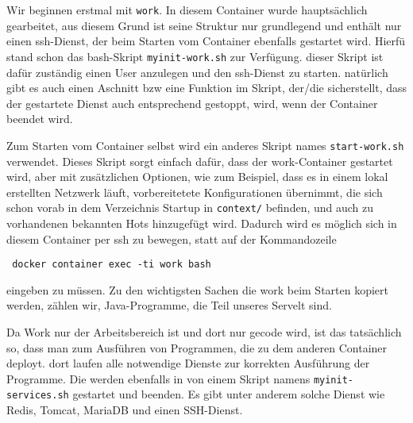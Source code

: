 Wir beginnen erstmal mit \texttt{work}. In diesem Container wurde hauptsächlich gearbeitet, aus diesem Grund ist seine Struktur nur grundlegend und enthält nur einen ssh-Dienst, der beim Starten vom Container ebenfalls gestartet wird. Hierfü stand schon das bash-Skript \texttt{myinit-work.sh} zur Verfügung. dieser Skript ist dafür zuständig einen User anzulegen und den ssh-Dienst zu starten. natürlich gibt es auch einen Aschnitt bzw eine Funktion im Skript, der/die sicherstellt, dass der gestartete Dienst auch entsprechend gestoppt, wird, wenn der Container beendet wird.



Zum Starten vom Container selbst wird ein anderes Skript names \texttt{start-work.sh} verwendet. Dieses Skript sorgt einfach dafür, dass der work-Container gestartet wird, aber mit zusätzlichen Optionen, wie zum Beispiel, dass es in einem lokal erstellten Netzwerk läuft, vorbereitetete Konfigurationen übernimmt, die sich schon vorab in dem Verzeichnis Startup in \texttt{context/} befinden, und auch zu vorhandenen bekannten Hots hinzugefügt wird. Dadurch wird es möglich sich in diesem Container per ssh zu bewegen, statt auf der Kommandozeile \begin{verbatim} docker container exec -ti work bash \end{verbatim} eingeben zu müssen. Zu den wichtigsten Sachen die work beim Starten kopiert werden, zählen wir, Java-Programme, die Teil unseres Servelt sind.

Da Work nur der Arbeitsbereich ist und dort nur gecode wird, ist das tatsächlich so, dass man zum Ausführen von Programmen, die zu dem anderen Container deployt. dort laufen alle notwendige Dienste zur korrekten Ausführung der Programme. Die werden ebenfalls in von einem Skript namens \texttt{myinit-services.sh} gestartet und beenden. Es gibt unter anderem solche Dienst wie Redis, Tomcat, MariaDB und einen SSH-Dienst.

